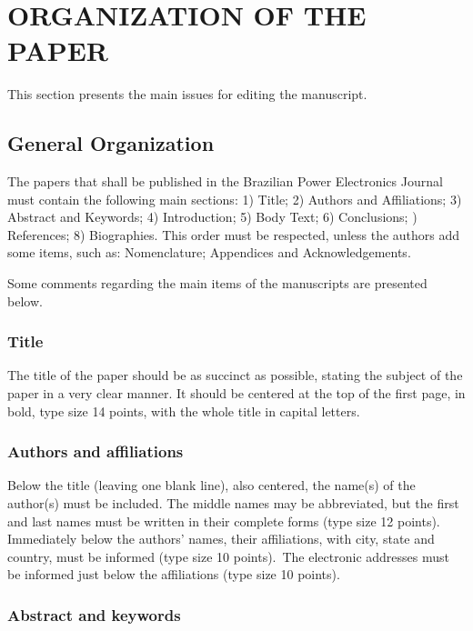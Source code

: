 \documentclass[english]{sobraep}
\begin{document}
\section{ORGANIZATION OF THE PAPER}

This section presents the main issues for editing the manuscript.

\subsection{General Organization}

The papers that shall be published in the Brazilian Power Electronics Journal must contain the following main sections:
1) Title; 2) Authors and Affiliations; 3) Abstract and Keywords; 4) Introduction; 5) Body Text; 6) Conclusions; ) References; 8) Biographies. This order must be respected, unless the authors add some items, such as: Nomenclature; Appendices and Acknowledgements.

Some comments regarding the main items of the manuscripts are presented below.

\subsubsection{Title}

The title of the paper should be as succinct as possible, stating the subject of the paper in a very clear manner. It should be centered at the top of the first page, in bold, type size 14 points, with the whole title in capital letters.

\subsubsection{Authors and affiliations}

Below the title (leaving one blank line), also centered, the name(s) of the author(s) must be included. The middle names may be abbreviated, but the first and last names must be written in their complete forms (type size 12 points). Immediately below the authors' names, their affiliations, with city, state and country, must be informed (type size 10 points).~The electronic addresses must be informed just below the affiliations (type size 10 points).

\subsubsection{Abstract and keywords}
\end{document}
